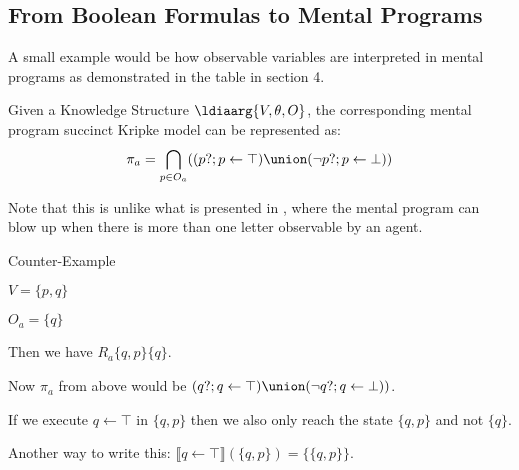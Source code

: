 \subsection{From Boolean Formulas to Mental Programs}

A small example would be how observable variables are interpreted in mental programs as demonstrated in the table in section 4.

Given a Knowledge Structure $\ldiaarg{V, \theta, O}$, the corresponding mental program succinct Kripke model can be represented as:
$$
\pi_a = \bigcap_{p\in O_a}((p?;p\leftarrow\top)\union(\neg p?;p\leftarrow\bot))
$$

Note that this is unlike what is presented in \cite{GatSymSucShifts2020}, where the mental program can blow up when there is more than one letter observable by an agent.

Counter-Example

$V = \{p,q\}$

$O_a = \{q\}$

Then we have $R_a \{q,p\} \{q\}$.

Now $\pi_a$ from above would be $(q?;q\leftarrow\top)\union(\neg q?;q\leftarrow\bot))$.

If we execute $q \leftarrow \top$ in $\{q,p\}$ then we also only reach the state $\{q,p\}$ and not $\{q\}$.

Another way to write this: $\llbracket q \leftarrow \top \rrbracket ( \{q,p\}) = \{ \{ q, p \} \}$.

